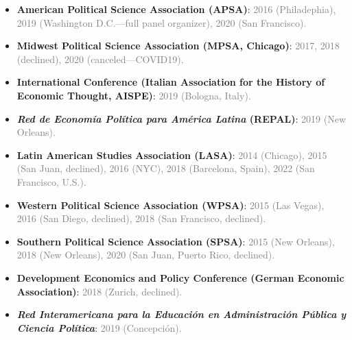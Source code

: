 \begin{itemize}
\item[\textcolor{gray}{\textbullet}] {\bf American Political Science Association (APSA)}: \textcolor{gray}{2016 (Philadephia), 2019 (Washington D.C.---full panel organizer), 2020 (San Francisco).}
\item[\textcolor{gray}{\textbullet}] {\bf Midwest Political Science Association (MPSA, Chicago)}: \textcolor{gray}{2017, 2018 (declined), 2020 (canceled---COVID19).}
\item[\textcolor{gray}{\textbullet}] {\bf International Conference (Italian Association for the History of Economic Thought, AISPE)}: \textcolor{gray}{2019 (Bologna, Italy).}
\item[\textcolor{gray}{\textbullet}] {\bf \emph{Red de Econom\'ia Pol\'itica para Am\'erica Latina} (REPAL)}: \textcolor{gray}{2019 (New Orleans).}
\item[\textcolor{gray}{\textbullet}] {\bf Latin American Studies Association (LASA)}: \textcolor{gray}{2014 (Chicago), 2015 (San Juan, declined), 2016 (NYC), 2018 (Barcelona, Spain), 2022 (San Francisco, U.S.).}
\item[\textcolor{gray}{\textbullet}] {\bf Western Political Science Association (WPSA)}: \textcolor{gray}{2015 (Las Vegas), 2016 (San Diego, declined), 2018 (San Francisco, declined).}
\item[\textcolor{gray}{\textbullet}] {\bf Southern Political Science Association (SPSA)}: \textcolor{gray}{2015 (New Orleans), 2018 (New Orleans), 2020 (San Juan, Puerto Rico, declined).}
\item[\textcolor{gray}{\textbullet}] {\bf Development Economics and Policy Conference (German Economic Association)}: \textcolor{gray}{2018 (Zurich, declined).}
\item[\textcolor{gray}{\textbullet}] {\bf \emph{Red Interamericana para la Educaci\'on en Administraci\'on P\'ublica y Ciencia Pol\'itica}}: \textcolor{gray}{2019 (Concepci\'on).}
\end{itemize}
